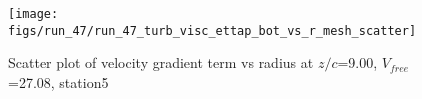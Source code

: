 \begin{figure}[H]
\centering
\texttt{[image: figs/run\_47/run\_47\_turb\_visc\_ettap\_bot\_vs\_r\_mesh\_scatter]}
\caption{Scatter plot of velocity gradient term vs radius at $z/c$=9.00, $V_{free}$=27.08, station5}
\label{fig:run_47_turb_visc_ettap_bot_vs_r_mesh_scatter}
\end{figure}


